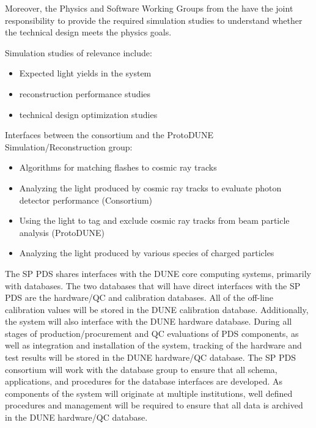 Moreover, the Physics and Software Working Groups from the \single {} have the joint responsibility to provide the required simulation studies to understand whether the \single {} technical design meets the physics goals.

Simulation studies of relevance include:
\begin{itemize}
    \item Expected light yields in the \single {} system
    \item \single {} reconstruction performance studies
    \item \single {} technical design optimization studies
\end{itemize}
    
Interfaces between the consortium and the ProtoDUNE Simulation/Reconstruction group:

\begin{itemize}
    \item Algorithms for matching flashes to cosmic ray tracks
    \item Analyzing the light produced by cosmic ray tracks to evaluate photon detector performance (Consortium)
    \item Using the light to tag and exclude cosmic ray tracks from beam particle analysis (ProtoDUNE)
    \item Analyzing the light produced by various species of charged particles
\end{itemize}


The SP PDS shares interfaces with the DUNE core computing systems, primarily with databases. The two databases that will have direct interfaces with the SP PDS are the hardware/QC and calibration databases. All of the off-line calibration values will be stored in the DUNE calibration database. Additionally, the system will also interface with the DUNE hardware database. During all stages of production/procurement and QC evaluations of PDS components, as well as integration and installation of the system, tracking of the hardware and test results will be stored in the DUNE hardware/QC database. The SP PDS consortium will work with the database group to ensure that all schema, applications, and procedures for the database interfaces are developed. As components of the system will originate at multiple institutions, well defined procedures and management will be required to ensure that all data is archived in the DUNE hardware/QC database. 


